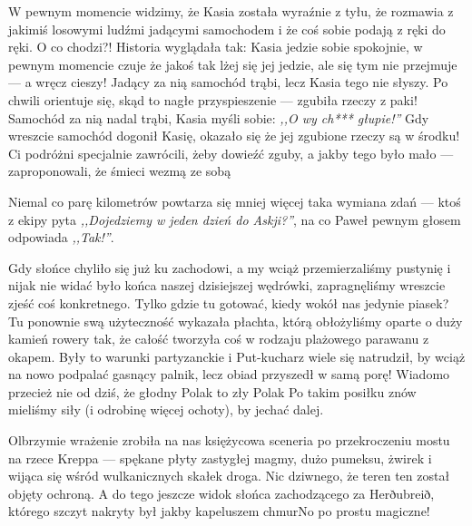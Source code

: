 

W pewnym momencie widzimy, że Kasia została wyraźnie z tyłu, że rozmawia z jakimiś losowymi ludźmi jadącymi samochodem i że coś sobie podają z ręki do ręki. O co chodzi?! Historia wyglądała tak: Kasia jedzie sobie spokojnie, w pewnym momencie czuje że jakoś tak lżej się jej jedzie, ale się tym nie przejmuje --- a wręcz cieszy! Jadący za nią samochód trąbi, lecz Kasia tego nie słyszy. Po chwili orientuje się, skąd to nagłe przyspieszenie --- zgubiła rzeczy z paki! Samochód za nią nadal trąbi, Kasia myśli sobie: \emph{,,O wy ch*** głupie!''} Gdy wreszcie samochód dogonił Kasię, okazało się że jej zgubione rzeczy są w środku! Ci podróżni specjalnie zawrócili, żeby dowieźć zguby, a jakby tego było mało --- zaproponowali, że śmieci wezmą ze sobą \smile

Niemal co parę kilometrów powtarza się mniej więcej taka wymiana zdań --- ktoś z ekipy pyta \emph{,,Dojedziemy w jeden dzień do Askji?''}, na co Paweł pewnym głosem odpowiada \emph{,,Tak!''}.


Gdy słońce chyliło się już ku zachodowi, a my wciąż przemierzaliśmy pustynię i nijak nie widać było końca naszej dzisiejszej wędrówki, zapragnęliśmy wreszcie zjeść coś konkretnego. Tylko gdzie tu gotować, kiedy wokół nas jedynie piasek? Tu ponownie swą użyteczność wykazała płachta, którą obłożyliśmy oparte o duży kamień rowery tak, że całość tworzyła coś w rodzaju plażowego parawanu z okapem. Były to warunki partyzanckie i Put-kucharz wiele się natrudził, by wciąż na nowo podpalać gasnący palnik, lecz obiad przyszedł w samą porę! Wiadomo przecież nie od dziś, że głodny Polak to zły Polak \wink Po takim posiłku znów mieliśmy siły (i odrobinę więcej ochoty), by jechać dalej.

Olbrzymie wrażenie zrobiła na nas księżycowa sceneria po przekroczeniu mostu na rzece Kreppa --- spękane płyty zastygłej magmy, dużo pumeksu, żwirek i wijąca się wśród wulkanicznych skałek droga. Nic dziwnego, że teren ten został objęty ochroną. A do tego jeszcze widok słońca zachodzącego za Herðubreið, którego szczyt nakryty był jakby kapeluszem chmur\textellipsis No po prostu magiczne!

